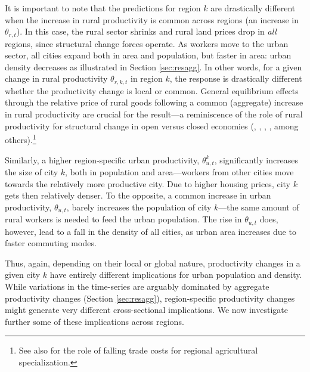 \documentclass[./20250130-paper.tex]{subfiles}
\begin{document}
It is important to note that the predictions for region $k$ are drastically different when the increase in rural productivity is common across regions (an increase in $\theta_{r,t}$). In this case, the rural sector shrinks and rural land prices drop in \emph{all} regions, since structural change forces operate. As workers move to the urban sector, all cities expand both in area and population, but faster in area: urban density decreases as illustrated in Section \ref{sec:resagg}. In other words, for a given change in rural productivity $\theta_{r,k,t}$ in region $k$, the response is drastically different whether the productivity change is local or common. General equilibrium effects through the relative price of rural goods following a common (aggregate) increase in rural productivity are crucial for the result---a reminiscence of the role of rural productivity for structural change in open versus closed economies (\cite{matsuyama1992agricultural}, \cite{gollin2010agricultural}, \cite{uy2013structural}, \cite{bustosetal2016}, \cite{teignier2018role} among others).\footnote{See also \cite{donaldson2016railroads} for the role of falling trade costs for regional agricultural specialization.}

Similarly, a higher region-specific urban productivity, $\theta^k_{u,t}$, significantly increases the size of city $k$, both in population and area---workers from other cities move towards the relatively more productive city. Due to higher housing prices, city $k$ gets then relatively denser. To the opposite, a common increase in urban productivity, $\theta_{u,t}$, barely increases the population of city $k$---the same amount of rural workers is needed to feed the urban population. The rise in $\theta_{u,t}$ does, however, lead to a fall in the density of all cities, as urban area increases due to faster commuting modes.  


Thus, again, depending on their local or global nature, productivity changes in a given city $k$ have entirely different implications for urban population and density. While variations in the time-series are arguably dominated by aggregate productivity changes (Section \ref{sec:resagg}), region-specific productivity changes might generate very different cross-sectional implications. We now investigate further some of these implications across regions.%
\end{document}
